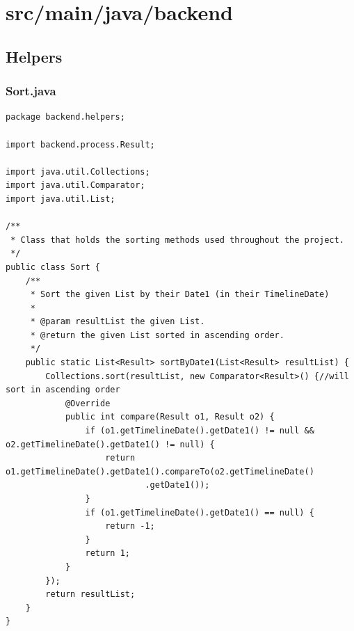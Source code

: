 \section{src/main/java/backend}
\subsection{Helpers}
\subsubsection{Sort.java}
\begin{lstlisting}
package backend.helpers;

import backend.process.Result;

import java.util.Collections;
import java.util.Comparator;
import java.util.List;

/**
 * Class that holds the sorting methods used throughout the project.
 */
public class Sort {
    /**
     * Sort the given List by their Date1 (in their TimelineDate)
     *
     * @param resultList the given List.
     * @return the given List sorted in ascending order.
     */
    public static List<Result> sortByDate1(List<Result> resultList) {
        Collections.sort(resultList, new Comparator<Result>() {//will sort in ascending order
            @Override
            public int compare(Result o1, Result o2) {
                if (o1.getTimelineDate().getDate1() != null && o2.getTimelineDate().getDate1() != null) {
                    return o1.getTimelineDate().getDate1().compareTo(o2.getTimelineDate()
                    		.getDate1());
                }
                if (o1.getTimelineDate().getDate1() == null) {
                    return -1;
                }
                return 1;
            }
        });
        return resultList;
    }
}
\end{lstlisting}
